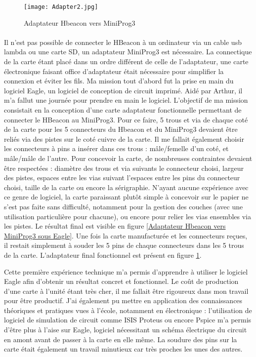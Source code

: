 \documentclass[12pt]{report}
\begin{document}
\begin{figure}
\begin{center}
\texttt{[image: Adapter2.jpg]}
\end{center}
\caption{Adaptateur Hbeacon vers MiniProg3}
\label{Adaptateur Hbeacon vers MiniProg3}
\end{figure}

\paragraph{}
Il n'est pas possible de connecter le HBeacon à un ordinateur via un cable usb lambda ou une carte SD, un adaptateur MiniProg3 est nécessaire. La connectique de la carte étant placé dans un ordre différent de celle de l'adaptateur, une carte électronique faisant office d'adaptateur était nécessaire pour simplifier la connexion et éviter les fils. 
Ma mission tout d'abord fut la prise en main du logiciel Eagle, un logiciel de conception de circuit imprimé. Aidé par Arthur, il m'a fallut une journée pour prendre en main le logiciel. 
L'objectif de ma mission consistait en la conception d'une carte adaptateur fonctionnelle permettant de connecter le HBeacon au MiniProg3. Pour ce faire, 5 trous et via de chaque coté de la carte pour les 5 connecteurs du Hbeacon et du MiniProg3 devaient être reliés via des pistes sur le coté cuivre de la carte. Il me fallait également choisir les connecteurs à pins a insérer dans ces trous : mâle/femelle d'un coté, et mâle/mâle de l'autre. Pour concevoir la carte, de nombreuses contraintes devaient être respectées : diamètre des trous et via suivants le connecteur choisi, largeur des pistes, espaces entre les vias suivant l'espaces entre les pins du connecteur choisi, taille de la carte ou encore la sérigraphie. N'ayant aucune expérience avec ce genre de logiciel, la carte paraissant plutôt simple à concevoir sur le papier ne s'est pas faite sans difficulté, notamment pour la gestion des couches (avec une utilisation particulière pour chacune), ou encore pour relier les vias ensembles via les pistes. Le résultat final est visible en figure \ref{Adaptateur Hbeacon vers MiniProg3 sous Eagle}. 
Une fois la carte manufacturée et les connecteurs reçues, il restait simplement à souder les 5 pins de chaque connecteurs dans les 5 trous de la carte. L'adaptateur final fonctionnel est présent en figure \ref{Adaptateur Hbeacon vers MiniProg3}.

Cette première expérience technique m'a permis d'apprendre à utiliser le logiciel Eagle afin d'obtenir un résultat concret et fonctionnel. Le coût de production d'une carte à l'unité étant très cher, il me fallait être rigoureux dans mon travail pour être productif. J'ai également pu mettre en application des connaissances théoriques et pratiques vues à l'école, notamment en électronique : l'utilisation de logiciel de simulation de circuit comme ISIS Proteus ou encore Pspice m'a permis d'être plus à l'aise sur Eagle, logiciel nécessitant un schéma électrique du circuit en amont avant de passer à la carte en elle même. La soudure des pins sur la carte était également un travail minutieux car très proches les unes des autres. 
\end{document}
